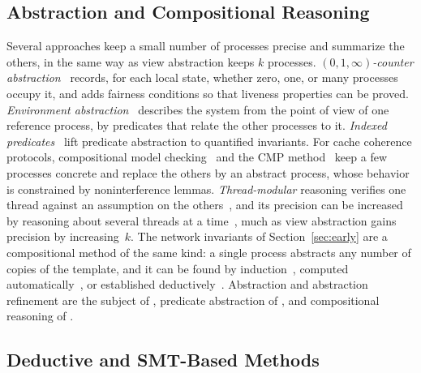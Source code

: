 \subsection{Abstraction and Compositional Reasoning}

Several approaches keep a small number of processes precise and summarize the
others, in the same way as view abstraction keeps $k$ processes.
\emph{$(0,1,\infty)$-counter abstraction}~\cite{PXZ02} records, for each local
state, whether zero, one, or many processes occupy it, and adds fairness
conditions so that liveness properties can be proved. \emph{Environment
abstraction}~\cite{CTV06,CTV08} describes the system from the point of view of
one reference process, by predicates that relate the other processes to it.
\emph{Indexed predicates}~\cite{LB07} lift predicate abstraction to quantified
invariants. For cache coherence protocols, compositional model
checking~\cite{McM01} and the CMP method~\cite{CMP04,TT08} keep a few
processes concrete and replace the others by an abstract process, whose
behavior is constrained by noninterference lemmas. \emph{Thread-modular}
reasoning verifies one thread against an assumption on the others~\cite{FQ03},
and its precision can be increased by reasoning about several threads at a
time~\cite{HMP17,FKP15}, much as view abstraction gains precision by
increasing~$k$. The network
invariants of Section~\ref{sec:early} are a compositional method of the same
kind: a single process abstracts any number of copies of the template, and it
can be found by induction~\cite{KM89,WL89}, computed
automatically~\cite{LHR97}, or established deductively~\cite{KPSZ02}.
Abstraction and abstraction refinement are the subject of
, predicate abstraction of , and compositional
reasoning of .

\subsection{Deductive and SMT-Based Methods}

